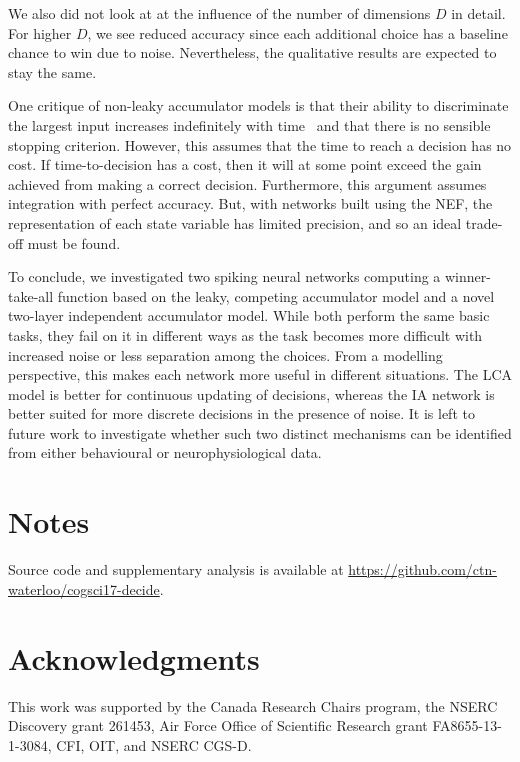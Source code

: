 \documentclass[10pt,letterpaper]{article}
\begin{document}
We also did not look at at the influence of the number of dimensions $D$ in detail.
For higher $D$, we see reduced accuracy since each additional choice has a baseline chance to win due to noise.
Nevertheless, the qualitative results are expected to stay the same.

One critique of non-leaky accumulator models is that their ability to discriminate the largest input increases indefinitely with time~\cite{usher2001} and that there is no sensible stopping criterion.
However, this assumes that the time to reach a decision has no cost.
If time-to-decision has a cost, then it will at some point exceed the gain achieved from making a correct decision.
Furthermore, this argument assumes integration with perfect accuracy.
But, with networks built using the NEF, the representation of each state variable has limited precision, and so an ideal trade-off must be found.

To conclude, we investigated two spiking neural networks computing a winner-take-all function based on the leaky, competing accumulator model and a novel two-layer independent accumulator model.
While both perform the same basic tasks, they fail on it in different ways as the task becomes more difficult with increased noise or less separation among the choices.
From a modelling perspective, this makes each network more useful in different situations.
The LCA model is better for continuous updating of decisions, whereas the IA network is better suited for more discrete decisions in the presence of noise.
It is left to future work to investigate whether such two distinct mechanisms can be identified from either behavioural or neurophysiological data.


\section{Notes}
Source code and supplementary analysis is available at \url{https://github.com/ctn-waterloo/cogsci17-decide}.

\section{Acknowledgments}
This work was supported by the Canada Research Chairs program,
the NSERC Discovery grant 261453, Air Force Office of Scientific Research grant FA8655-13-1-3084, CFI, OIT, and NSERC CGS-D\@.  %



\setlength{\bibleftmargin}{.125in}
\setlength{\bibindent}{-\bibleftmargin}


\end{document}
